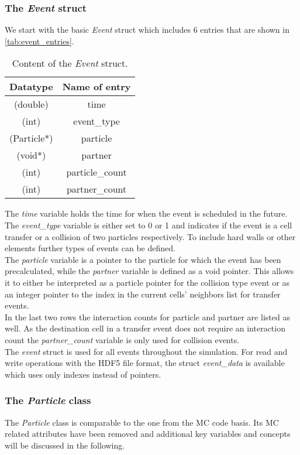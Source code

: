 \subsubsection{The \textit{Event} struct}
\label{sec:event_struct}
We start with the basic \textit{Event} struct which includes 6 entries that are shown in \autoref{tab:event_entries}.
\begin{table}[h!]
\centering
\begin{tabular}{c|c}
\textbf{Datatype} & \textbf{Name of entry}\\ \hline
(double) & time \\
(int) & event\_type \\
(Particle*)  & particle \\
(void*) & partner \\
(int) & particle\_count \\
(int) & partner\_count \\
\end{tabular}
\caption[\textit{Event} struct content]{Content of the \textit{Event} struct.}
\label{tab:event_entries}
\end{table}
The \textit{time} variable holds the time for when the event is scheduled in the future. The \textit{event\_type} variable is either set to 0 or 1 and indicates if the event is a cell transfer or a collision of two particles respectively. To include hard walls or other elements further types of events can be defined.\\
The \textit{particle} variable is a pointer to the particle for which the event has been precalculated, while the \textit{partner} variable is defined as a void pointer. This allows it to either be interpreted as a particle pointer for the collision type event or as an integer pointer to the index in the current cells' neighbors list for transfer events.\\
In the last two rows the interaction counts for particle and partner are listed as well. As the destination cell in a transfer event does not require an interaction count the \textit{partner\_count} variable is only used for collision events.\\

The \textit{event} struct is used for all events throughout the simulation. For read and write operations with the HDF5 file format, the struct \textit{event\_data} is available which uses only indexes instead of pointers.

\subsubsection{The \textit{Particle} class}
\label{sec:particle_class}
The \textit{Particle} class is comparable to the one from the MC code basis. Its MC related attributes have been removed and additional key variables and concepts will be discussed in the following.\\

